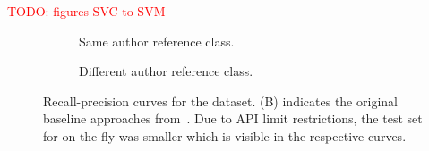 \textcolor{red}{TODO: figures SVC to SVM}
\begin{figure}[htbp]
  \centering
  \begin{subfigure}[b]{0.49\textwidth}
    \centering
    
    \caption{Same author reference class. }
    \label{fig:blog_same_author}
  \end{subfigure}
  \hfill
  \begin{subfigure}[b]{0.49\textwidth}
    \centering
    
    \caption{Different author reference class.}
    \label{fig:blog_diff_author}
  \end{subfigure}
  \caption[Recall-precision curves for the \dataBlog{} dataset. ]{Recall-precision curves for the \dataBlog{} dataset. 
  (B) indicates the original baseline approaches from~\citep{koppel_determining_2014}.
  Due to API limit restrictions, the test set for on-the-fly was smaller which is visible in the respective curves.}
  \label{fig:diff_imp_gen_blog}
\end{figure}
